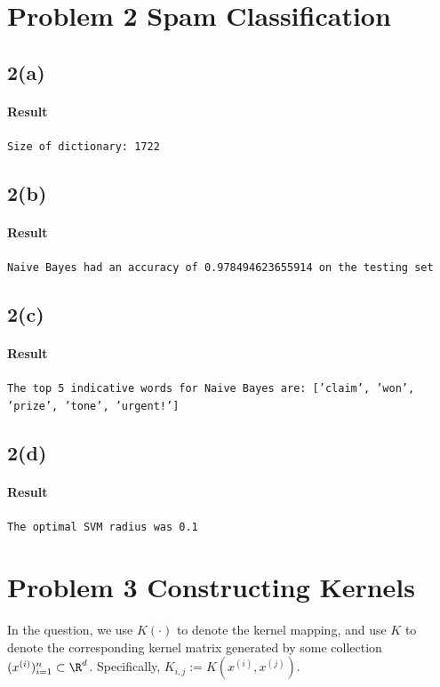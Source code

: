 \documentclass[11pt]{article}
\newcommand{\upi}[0]{^{(i)}}
\begin{document}
	\newpage
	\section{Problem 2 Spam Classification}
	\subsection{2(a)}
	\paragraph{Result} \texttt{Size of dictionary: 1722}
	
	\newpage
	\subsection{2(b)}
	\paragraph{Result} \texttt{Naive Bayes had an accuracy of 0.978494623655914 on the testing set}
	
	\newpage
	\subsection{2(c)}
	\paragraph{Result} \texttt{The top 5 indicative words for Naive Bayes are:  ['claim', 'won', 'prize', 'tone', 'urgent!']}
	
	\newpage
	\subsection{2(d)}
	\paragraph{Result} \texttt{The optimal SVM radius was 0.1}
	
	\newpage
	\section{Problem 3 Constructing Kernels}
	\begin{notation}
		In the question, we use $K(\cdot)$ to denote the kernel mapping, and use $K$ to denote the corresponding kernel matrix generated by some collection $(x\upi)_{i=1}^n \subset \R^d$. Specifically, $K_{i, j} := K(x\upi, x^{(j)})$.
	\end{notation}
\end{document}
